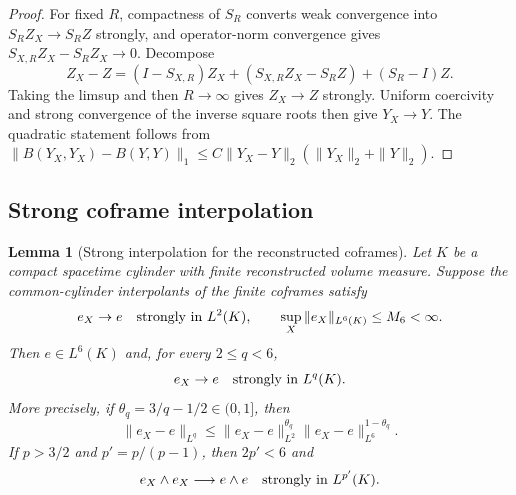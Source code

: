 \documentclass[11pt]{article}
\numberwithin{equation}{section}
\newtheorem{lemma}[lemma]{Lemma}
\theoremstyle{definition}
\theoremstyle{remark}
\begin{document}
\begin{proof}
For fixed $R$, compactness of $S_R$ converts weak convergence into
$S_RZ_X\to S_RZ$ strongly, and operator-norm convergence gives
$S_{X,R}Z_X-S_RZ_X\to0$.  Decompose
\[
 Z_X-Z=(I-S_{X,R})Z_X+(S_{X,R}Z_X-S_RZ)+(S_R-I)Z.
\]
Taking the limsup and then $R\to\infty$ gives $Z_X\to Z$ strongly.  Uniform
coercivity and strong convergence of the inverse square roots then give
$Y_X\to Y$.  The quadratic statement follows from
$\|B(Y_X,Y_X)-B(Y,Y)\|_1\le C\|Y_X-Y\|_2(\|Y_X\|_2+\|Y\|_2)$.
\end{proof}

\subsection{Strong coframe interpolation}

\begin{lemma}[Strong interpolation for the reconstructed coframes]
\label{lem:supp-coframe-interpolation}
Let $K$ be a compact spacetime cylinder with finite reconstructed volume measure.
Suppose the common-cylinder interpolants of the finite coframes satisfy
\begin{equation}
 e_X\to e\quad\hbox{strongly in }L^2(K),
 \qquad
 \sup_X\|e_X\|_{L^6(K)}\le M_6<\infty.
 \label{eq:supp-coframe-l2-l6}
\end{equation}
Then $e\in L^6(K)$ and, for every $2\le q<6$,
\begin{equation}
 e_X\to e\quad\hbox{strongly in }L^q(K).
 \label{eq:supp-strong-lq}
\end{equation}
More precisely, if
$\theta_q=3/q-1/2\in(0,1]$, then
\begin{equation}
 \|e_X-e\|_{L^q}
 \le \|e_X-e\|_{L^2}^{\theta_q}
      \|e_X-e\|_{L^6}^{1-\theta_q}.
 \label{eq:supp-interpolation-explicit}
\end{equation}
If $p>3/2$ and $p'=p/(p-1)$, then $2p'<6$ and
\begin{equation}
 e_X\wedge e_X\longrightarrow e\wedge e
 \quad\hbox{strongly in }L^{p'}(K).
 \label{eq:supp-bivector-strong}
\end{equation}
\end{lemma}
\end{document}
